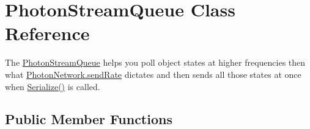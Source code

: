 \hypertarget{class_photon_stream_queue}{}\section{Photon\+Stream\+Queue Class Reference}
\label{class_photon_stream_queue}


The \hyperlink{class_photon_stream_queue}{Photon\+Stream\+Queue} helps you poll object states at higher frequencies then what \hyperlink{class_photon_network_a154fc601fac7f0fddd704231189457fb}{Photon\+Network.\+send\+Rate} dictates and then sends all those states at once when \hyperlink{class_photon_stream_queue_ae75447cd718116990e0d0304eebc6935}{Serialize()} is called.  


\subsection*{Public Member Functions}
